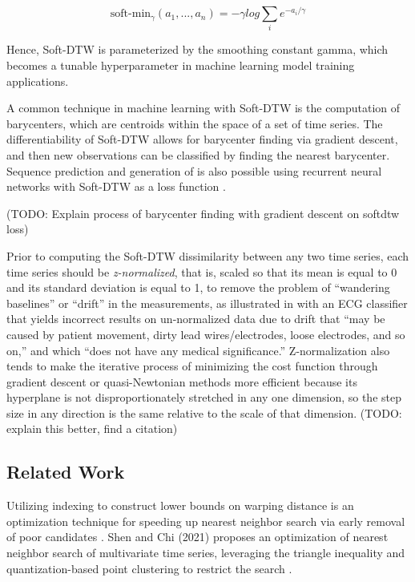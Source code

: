\documentclass[12pt, letterpaper]{article}
\begin{document}
\begin{equation} \label{softdtw}
\text{soft-min}_\gamma(a_1,...,a_n) = -\gamma log\sum_{i}e^{-a_i/\gamma}
\end{equation}

Hence, Soft-DTW is parameterized by the smoothing constant gamma, which becomes
a tunable hyperparameter in machine learning model training applications.

A common technique in machine learning with Soft-DTW is the computation of
barycenters, which are centroids within the space of a set of time series. The
differentiability of Soft-DTW allows for barycenter finding via gradient
descent, and then new observations can be classified by finding the nearest
barycenter. Sequence prediction and generation of is also possible using
recurrent neural networks with Soft-DTW as a loss function
\cite{cuturi_soft-dtw_2018}.

(TODO: Explain process of barycenter finding with gradient descent on softdtw
loss)

Prior to computing the Soft-DTW dissimilarity between any two time series, each
time series should be \emph{z-normalized}, that is, scaled so that its mean is
equal to 0 and its standard deviation is equal to 1, to remove the problem of
``wandering baselines'' or ``drift'' in the measurements, as illustrated in
\cite{rakthanmanon_addressing_2013} with an ECG classifier that yields incorrect
results on un-normalized data due to drift that ``may be caused by patient
movement, dirty lead wires/electrodes, loose electrodes, and so on,'' and which
``does not have any medical significance.'' Z-normalization also tends to make
the iterative process of minimizing the cost function through gradient descent
or quasi-Newtonian methods more efficient because its hyperplane is not
disproportionately stretched in any one dimension, so the step size in any
direction is the same relative to the scale of that dimension. (TODO: explain
this better, find a citation)

\subsection{Related Work}

Utilizing indexing to construct lower bounds on warping distance is an
optimization technique for speeding up nearest neighbor search via early removal
of poor candidates \cite{keogh_exact_2002}. Shen and Chi (2021) proposes an
optimization of nearest neighbor search of multivariate time series, leveraging
the triangle inequality and quantization-based point clustering to restrict the
search \cite{shen_tc-dtw_2021}.
\end{document}
